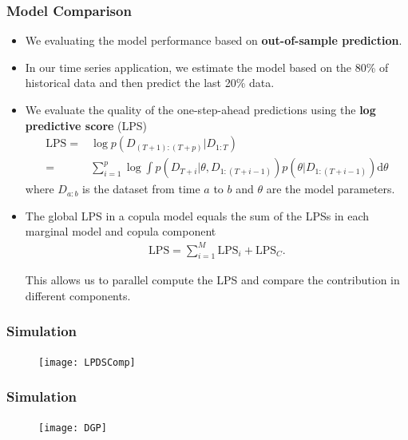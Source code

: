 \documentclass[10pt,aspectratio=169]{beamer}
\begin{document}
\begin{frame}
  \frametitle{Model Comparison}
  \begin{itemize}
  \item We evaluating the model performance based on \textbf{out-of-sample prediction}.
  \item In our time series application, we estimate the model based on the 80\% of
    historical data and then predict the last 20\% data.

  \item We evaluate the quality of the one-step-ahead predictions using the \textbf{log
      predictive score} (LPS)
    \begin{align*}
      \mathrm{LPS}=&\log p(D_{(T+1):(T+p)}|D_{1:T})\\
      =&\sum\nolimits _{i=1}^{p}\log\int p(D_{T+i}|\theta,D_{1:(T+i-1)})p(\theta|D_{1:(T+i-1)})\mathrm{d}\theta
    \end{align*}
    where $D_{a:b}$ is the dataset from time $a$ to $b$ and $\theta$ are the model
    parameters.

  \item The global LPS in a copula model equals the sum of the LPSs in each marginal model
    and copula component
    \begin{align*}
    \mathrm{LPS}=\sum\nolimits _{i=1}^M \mathrm{LPS}_i + \mathrm{LPS}_C.
    \end{align*}

    This allows us to parallel compute the LPS and compare the contribution in different
    components.

  \end{itemize}
\end{frame}


\begin{frame}
  \frametitle{Simulation}

  \begin{figure}[!h]
    \centering
    \texttt{[image: LPDSComp]}
  \end{figure}
\end{frame}

\begin{frame}
  \frametitle{Simulation}

  \begin{figure}[!h]
    \centering
    \texttt{[image: DGP]}
  \end{figure}
\end{frame}
\end{document}
